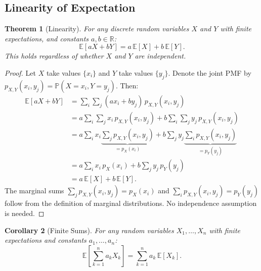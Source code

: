 \documentclass[11pt,a4paper]{article}
\theoremstyle{definition}
\theoremstyle{plain}
\newtheorem{theorem}{Theorem}[section]
\newtheorem{corollary}[theorem]{Corollary}
\theoremstyle{remark}
\newcommand{\E}{\mathbb{E}}
\newcommand{\R}{\mathbb{R}}
\newcommand{\Prob}{\mathbb{P}}
\begin{document}
\subsection{Linearity of Expectation}
\label{subsec:linearity}

\begin{keyresult}
\begin{theorem}[Linearity]
\label{thm:linearity}
For any discrete random variables $X$ and $Y$ with finite expectations, and constants $a, b \in \R$:
\begin{equation}
    \E[aX + bY] = a\,\E[X] + b\,\E[Y].
    \label{eq:linearity}
\end{equation}
This holds regardless of whether $X$ and $Y$ are independent.
\end{theorem}
\end{keyresult}

\begin{proof}
Let $X$ take values $\{x_i\}$ and $Y$ take values $\{y_j\}$. Denote the joint PMF by $p_{X,Y}(x_i, y_j) = \Prob(X = x_i, Y = y_j)$. Then:
\begin{align}
    \E[aX + bY]
    &= \sum_{i}\sum_{j} (a x_i + b y_j)\, p_{X,Y}(x_i, y_j) \nonumber\\
    &= a \sum_{i}\sum_{j} x_i\, p_{X,Y}(x_i, y_j) + b \sum_{i}\sum_{j} y_j\, p_{X,Y}(x_i, y_j) \nonumber\\
    &= a \sum_{i} x_i \underbrace{\sum_{j} p_{X,Y}(x_i, y_j)}_{= p_X(x_i)} + b \sum_{j} y_j \underbrace{\sum_{i} p_{X,Y}(x_i, y_j)}_{= p_Y(y_j)} \nonumber\\
    &= a \sum_{i} x_i\, p_X(x_i) + b \sum_{j} y_j\, p_Y(y_j) \nonumber\\
    &= a\,\E[X] + b\,\E[Y]. \label{eq:linearity_proof}
\end{align}
The marginal sums $\sum_j p_{X,Y}(x_i, y_j) = p_X(x_i)$ and $\sum_i p_{X,Y}(x_i, y_j) = p_Y(y_j)$ follow from the definition of marginal distributions. No independence assumption is needed.
\end{proof}

\begin{corollary}[Finite Sums]
\label{cor:linearity_sum}
For any random variables $X_1, \ldots, X_n$ with finite expectations and constants $a_1, \ldots, a_n$:
\begin{equation}
    \E\!\left[\sum_{k=1}^n a_k X_k\right] = \sum_{k=1}^n a_k\,\E[X_k].
    \label{eq:linearity_sum}
\end{equation}
\end{corollary}
\end{document}
